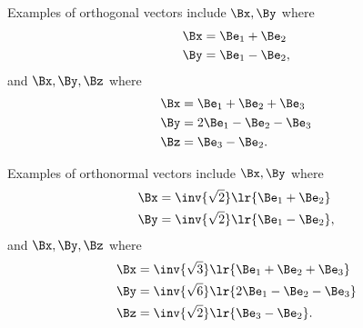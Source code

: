 %
%

Examples of orthogonal vectors
include \( \Bx, \By \) where
\begin{equation}\label{eqn:prereq_standardbasis:300}
\begin{aligned}
\Bx &= \Be_1 + \Be_2 \\
\By &= \Be_1 - \Be_2,
\end{aligned}
\end{equation}
and \( \Bx, \By, \Bz \) where
\begin{equation}\label{eqn:prereq_standardbasis:320}
\begin{aligned}
\Bx &= \Be_1 + \Be_2 + \Be_3 \\
\By &= 2 \Be_1 - \Be_2 - \Be_3 \\
\Bz &= \Be_3 - \Be_2.
\end{aligned}
\end{equation}


Examples of orthonormal vectors
include \( \Bx, \By \) where
\begin{equation}\label{eqn:prereq_standardbasis:340}
\begin{aligned}
\Bx &= \inv{\sqrt{2}}\lr{\Be_1 + \Be_2} \\
\By &= \inv{\sqrt{2}}\lr{\Be_1 - \Be_2},
\end{aligned}
\end{equation}
and \( \Bx, \By, \Bz \) where
\begin{equation}\label{eqn:prereq_standardbasis:360}
\begin{aligned}
\Bx &= \inv{\sqrt{3}}\lr{\Be_1 + \Be_2 + \Be_3} \\
\By &= \inv{\sqrt{6}}\lr{2 \Be_1 - \Be_2 - \Be_3} \\
\Bz &= \inv{\sqrt{2}}\lr{\Be_3 - \Be_2}.
\end{aligned}
\end{equation}

